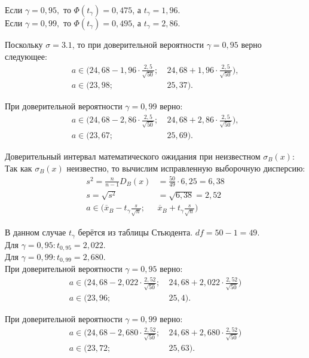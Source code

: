 \documentclass[utf8, a4paper, 14pt, russian, oneside]{book}
\begin{document}
Если $\gamma = 0,95,$ то $\Phi(t_\gamma) = 0,475$, а $t_\gamma = 1,96$.\\
Если $\gamma = 0,99,$ то $\Phi(t_\gamma) = 0,495$, а $t_\gamma = 2,86$.

Поскольку $\sigma = 3.1$, то при доверительной вероятности $\gamma = 0,95$ верно следующее:
\begin{align*}
    a \in \Big(24,68 - 1,96\cdot \frac{2,5}{\sqrt{50}};\  & 24,68 + 1,96\cdot \frac{2,5}{\sqrt{50}}\Big), \\
    a \in ( 23,98;\  & 25,37 ).
\end{align*}

При доверительной вероятности $\gamma=0,99$ верно:
\begin{align*}
    a \in \Big(24,68 - 2,86\cdot \frac{2,5}{\sqrt{50}};\  & 24,68 + 2,86\cdot \frac{2,5}{\sqrt{50}}\Big), \\
    a \in ( 23,67;\  & 25,69 ).
\end{align*}

Доверительный интервал математического ожидания при неизвестном $\sigma_B(x)$:
Так как $\sigma_B(x)$ неизвестно, то вычислим исправленную выборочную дисперсию:
\begin{align*}
    s^2 = \frac{n}{n-1}D_B(x) &= \frac{50}{49} \cdot 6,25 = 6,38 \\
    s = \sqrt{s^2} &= \sqrt{6,38} = 2,52 \\ 
    a \in \Big( \overline{x}_B - t_\gamma\frac{s}{\sqrt{n}};\  & \overline{x}_B + t_\gamma\frac{s}{\sqrt{n}} \Big)
\end{align*}

В данном случае $t_\gamma$ берётся из таблицы Стьюдента. $df = 50 - 1 = 49$.\\
Для $\gamma = 0,95: t_{0,95} = 2,022.$\\
Для $\gamma = 0,99: t_{0,99} = 2,680.$\\

При доверительной вероятности $\gamma=0,95$ верно:
\begin{align*}
    a \in \Big( 24,68 - 2,022 \cdot \frac{2,52}{\sqrt{50}};\  & 24,68 + 2,022 \cdot \frac{2,52}{\sqrt{50}} \Big)\\
    a \in ( 23,96;\  & 25,4).
\end{align*}

При доверительной вероятности $\gamma=0,99$ верно:
\begin{align*}
    a \in \Big( 24,68 - 2,680 \cdot \frac{2,52}{\sqrt{50}};\  & 24,68 + 2,680 \cdot \frac{2,52}{\sqrt{50}} \Big)\\
    a \in ( 23,72;\ & 25,63).
\end{align*}
\end{document}
